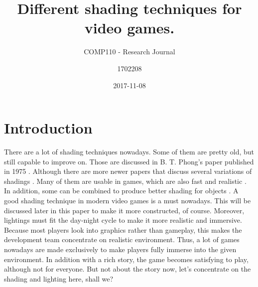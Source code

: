 \documentclass{scrartcl}
\title{Different shading techniques for video games.}
\subtitle{COMP110 - Research Journal}
\author{1702208}
\date{2017-11-08}
\begin{document}
\maketitle{}

\newpage{}

\section{Introduction}
There are a lot of shading techniques nowadays.
Some of them are pretty old, but still capable to improve on.
Those are discussed in B. T. Phong's paper published in 1975 \cite{phong1975illumination}.
Although there are more newer papers that discuss several variations of shadings \cite{zhang1994analysis}.
Many of them are usable in games, which are also fast and realistic \cite{iones2003fast}.
In addition, some can be combined to produce better shading for objects \cite{blinn1976texture}.
A good shading technique in modern video games is a must nowadays.
This will be discussed later in this paper to make it more constructed, of course.
Moreover, lightings must fit the day-night cycle to make it more realistic and immersive.
Because most players look into graphics rather than gameplay, this makes the development team concentrate on realistic environment.
Thus, a lot of games nowadays are made exclusively to make players fully immerse into the given environment.
In addition with a rich story, the game becomes satisfying to play, although not for everyone.
But not about the story now, let's concentrate on the shading and lighting here, shall we?
\end{document}
